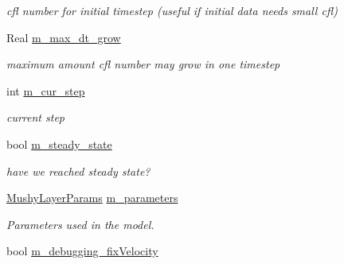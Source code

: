\begin{DoxyCompactItemize}
\begin{DoxyCompactList}\small\item\em cfl number for initial timestep (useful if initial data needs small cfl) \end{DoxyCompactList}\item 
\hypertarget{classamr_mushy_layer_ac58670c2e03b19ab37cec285a7cc9792}{Real \hyperlink{classamr_mushy_layer_ac58670c2e03b19ab37cec285a7cc9792}{m\-\_\-max\-\_\-dt\-\_\-grow}}\label{classamr_mushy_layer_ac58670c2e03b19ab37cec285a7cc9792}

\begin{DoxyCompactList}\small\item\em maximum amount cfl number may grow in one timestep \end{DoxyCompactList}\item 
\hypertarget{classamr_mushy_layer_ae0814b89090383705d3853338924c846}{int \hyperlink{classamr_mushy_layer_ae0814b89090383705d3853338924c846}{m\-\_\-cur\-\_\-step}}\label{classamr_mushy_layer_ae0814b89090383705d3853338924c846}

\begin{DoxyCompactList}\small\item\em current step \end{DoxyCompactList}\item 
\hypertarget{classamr_mushy_layer_a2b22606f1274ddd091de6e8eeee91047}{bool \hyperlink{classamr_mushy_layer_a2b22606f1274ddd091de6e8eeee91047}{m\-\_\-steady\-\_\-state}}\label{classamr_mushy_layer_a2b22606f1274ddd091de6e8eeee91047}

\begin{DoxyCompactList}\small\item\em have we reached steady state? \end{DoxyCompactList}\item 
\hypertarget{classamr_mushy_layer_a1a9448460955d41f98fac01c5dfef6d8}{\hyperlink{class_mushy_layer_params}{Mushy\-Layer\-Params} \hyperlink{classamr_mushy_layer_a1a9448460955d41f98fac01c5dfef6d8}{m\-\_\-parameters}}\label{classamr_mushy_layer_a1a9448460955d41f98fac01c5dfef6d8}

\begin{DoxyCompactList}\small\item\em Parameters used in the model. \end{DoxyCompactList}\item 
\hypertarget{classamr_mushy_layer_a865993093d68eb322c4936c4dde1ee22}{bool \hyperlink{classamr_mushy_layer_a865993093d68eb322c4936c4dde1ee22}{m\-\_\-debugging\-\_\-fix\-Velocity}}\label{classamr_mushy_layer_a865993093d68eb322c4936c4dde1ee22}


\end{DoxyCompactItemize}
